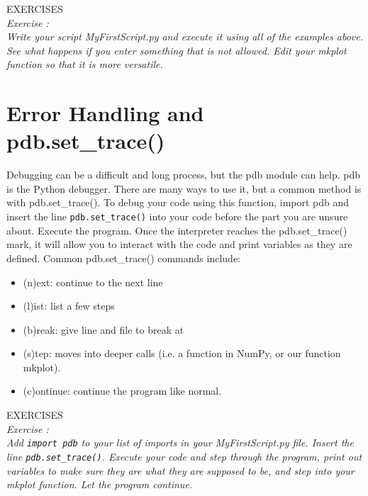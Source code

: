 {\color{blue} {\sf\small EXERCISES}} \\
{\it Exercise  :  \\
  Write your script MyFirstScript.py and execute it using all of the
  examples above.  See what happens if you enter something that is not
  allowed.  Edit your mkplot function so that it is more versatile.  }

\section{Error Handling and {\sf pdb.set\_trace()}}
Debugging can be a difficult and long process, but the {\sf\small pdb}
module can help.  {\sf\small pdb} is the Python debugger.  There are
many ways to use it, but a common method is with {\sf\small
  pdb.set\_trace()}.  To debug your code using this function, import
{\sf\small pdb} and insert the line \texttt{pdb.set\_trace()} into your
code before the part you are unsure about.  Execute the program.  Once
the interpreter reaches the {\sf\small pdb.set\_trace()} mark, it will
allow you to interact with the code and print variables as they are
defined.   Common {\sf\small pdb.set\_trace()} commands include:
\begin{itemize}
\item (n)ext:    continue to the next line
\item (l)ist:      list a few steps
\item (b)reak:  give line and file to break at
\item (s)tep:    moves into deeper calls (i.e. a function in NumPy, or
  our function {\sf\small mkplot}).
\item (c)ontinue: continue the program like normal.
\end{itemize}

{\color{blue} {\sf\small EXERCISES}} \\
{\it Exercise  :  \\
  Add \texttt{import pdb} to your list of imports in your
  MyFirstScript.py file.  Insert the line \texttt{pdb.set\_trace()}.
  Execute your code and step through the program, print out variables
  to make sure they are what they are supposed to be, and step into
  your mkplot function.  Let the program continue. }


